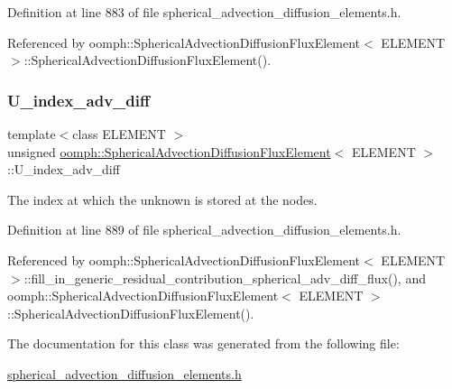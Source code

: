Definition at line 883 of file spherical\+\_\+advection\+\_\+diffusion\+\_\+elements.\+h.



Referenced by oomph\+::\+Spherical\+Advection\+Diffusion\+Flux\+Element$<$ E\+L\+E\+M\+E\+N\+T $>$\+::\+Spherical\+Advection\+Diffusion\+Flux\+Element().

\mbox{\label{classoomph_1_1SphericalAdvectionDiffusionFluxElement_a03f3019943b1bd0d2818882c08f955f4}} 
\subsubsection{\texorpdfstring{U\+\_\+index\+\_\+adv\+\_\+diff}{U\_index\_adv\_diff}}
{\footnotesize\ttfamily template$<$class E\+L\+E\+M\+E\+NT $>$ \\
unsigned \hyperlink{classoomph_1_1SphericalAdvectionDiffusionFluxElement}{oomph\+::\+Spherical\+Advection\+Diffusion\+Flux\+Element}$<$ E\+L\+E\+M\+E\+NT $>$\+::U\+\_\+index\+\_\+adv\+\_\+diff\hspace{0.3cm}{\ttfamily [private]}}



The index at which the unknown is stored at the nodes. 



Definition at line 889 of file spherical\+\_\+advection\+\_\+diffusion\+\_\+elements.\+h.



Referenced by oomph\+::\+Spherical\+Advection\+Diffusion\+Flux\+Element$<$ E\+L\+E\+M\+E\+N\+T $>$\+::fill\+\_\+in\+\_\+generic\+\_\+residual\+\_\+contribution\+\_\+spherical\+\_\+adv\+\_\+diff\+\_\+flux(), and oomph\+::\+Spherical\+Advection\+Diffusion\+Flux\+Element$<$ E\+L\+E\+M\+E\+N\+T $>$\+::\+Spherical\+Advection\+Diffusion\+Flux\+Element().



The documentation for this class was generated from the following file\+:\begin{DoxyCompactItemize}
\item 
\hyperlink{spherical__advection__diffusion__elements_8h}{spherical\+\_\+advection\+\_\+diffusion\+\_\+elements.\+h}\end{DoxyCompactItemize}
